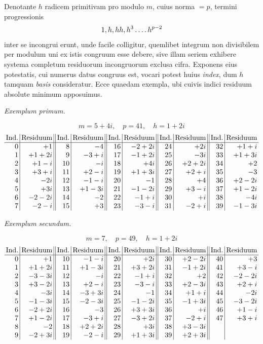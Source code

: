 Denotante $h$ radicem primitivam pro modulo $m$, cuius norma $=p$, termini progressionis
\[
1,h,hh,h^3\mathinner{.\,.\,.\,.} h^{p-2}
\]
inter se incongrui erunt, unde facile colligitur, quemlibet integrum non divisibilem per modulum uni ex istis congruum esse debere, sive illam seriem exhibere systema completum residuorum incongruorum exclusa cifra. Exponens eius potestatis, cui numerus datus congruus est, vocari potest huius \emph{index}, dum $h$ tamquam \emph{basis} consideratur. Ecce quaedam exempla, ubi cuivis indici residuum absolute minimum apposuimus.

\begin{center}\emph{Exemplum primum.}\end{center}
\[
m=5+4i,\quad p=41,\quad h=1+2i
\]
\begingroup\small
\[
\setlength{\arraycolsep}{2pt}
\begin{array}{r|r||r|r||r|r||r|r||r|r}
\text{Ind.}&\text{Residuum}&\text{Ind.}&\text{Residuum}&\text{Ind.}&\text{Residuum}&\text{Ind.}&\text{Residuum}&\text{Ind.}&\text{Residuum}\\\hline
0&+1&8&-4&16&-2+2i&24&+2i&32&+1+i\\
1&+1+2i&9&-3+i&17&-1+2i&25&-3i&33&+1+3i\\
2&+1-i&10&-i&18&+4i&26&+2+2i&34&+2\\
3&+3+i&11&+2-i&19&+1+3i&27&+2+i&35&-3\\
4&-2i&12&-1-i&20&-1&28&+4&36&+2-2i\\
5&+3i&13&+1-3i&21&-1-2i&29&+3-i&37&+1-2i\\
6&-2-2i&14&-2&22&-1+i&30&+i&38&-4i\\
7&-2-i&15&+3&23&-3-i&31&-2+i&39&-1-3i
\end{array}
\]
\endgroup

%
\begin{center}\emph{Exemplum secundum.}\end{center}
\[
m=7,\quad p=49,\quad h=1+2i
\]
\begingroup\small
\[
\setlength{\arraycolsep}{2pt}
\begin{array}{r|r||r|r||r|r||r|r||r|r}
\text{Ind.}&\text{Residuum}&\text{Ind.}&\text{Residuum}&\text{Ind.}&\text{Residuum}&\text{Ind.}&\text{Residuum}&\text{Ind.}&\text{Residuum}\\\hline
0&+1&10&-1-i&20&+2i&30&+2-2i&40&+3\\
1&+1+2i&11&+1-3i&21&+3+2i&31&-1+2i&41&+3-i\\
2&-3-3i&12&-i&22&-1+i&32&+2&42&-2-2i\\
3&+3-2i&13&+2-i&23&-3-i&33&+2-3i&43&+2+i\\
4&-3i&14&-3+3i&24&-1&34&+1+i&44&-2i\\
5&-1-3i&15&-2-3i&25&-1-2i&35&-1+3i&45&-3-2i\\
6&-2+2i&16&-3&26&+3+3i&36&+i&46&+1-i\\
7&+1-2i&17&-3+i&27&-3+2i&37&-2+i&47&+3+i\\
8&-2&18&+2+2i&28&+3i&38&+3-3i&&\\
9&-2+3i&19&-2-i&29&+1+3i&39&+2+3i&&
\end{array}
\]
\endgroup

